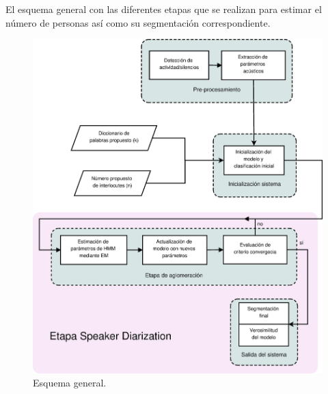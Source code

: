 El esquema general con las diferentes etapas que se realizan para estimar el número de personas así como su segmentación correspondiente.

\begin{figure}[bth]
  \centerline
  {\includegraphics[width=1.5\linewidth]{gfx/chap5/general_flow}} \quad
  \caption{Esquema general.}
  \label{fig:esquema2}
\end{figure}